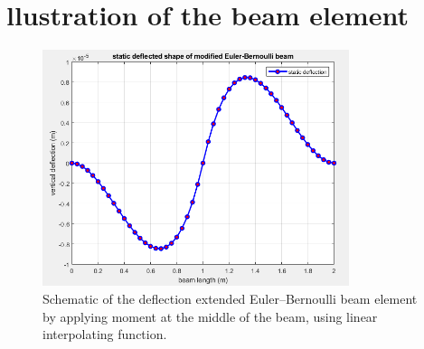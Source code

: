 \documentclass{article}
\begin{document}
	\section*{llustration of the beam element}
	\begin{figure}[ht]
		\centering
		\includegraphics[width=0.8\textwidth]{Linear_Axial.png}
		\caption{Schematic of the deflection extended Euler--Bernoulli beam element by applying moment at the middle of the beam, using linear interpolating function.}
		\label{fig:beam-element}
	\end{figure}
	
\end{document}

